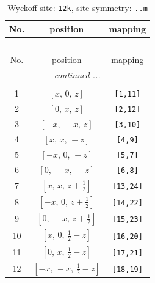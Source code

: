 \documentclass[fleqn,8pt]{jsarticle}
\begin{document}
\begin{longtable}{ccc}
\caption{Wyckoff site: {\tt 12k}, site symmetry: {\tt ..m}}
 \\
 \hline \hline
No. & position & mapping \\ \hline \endfirsthead

\multicolumn{2}{l}{\tablename\ \thetable{}} \\
 \hline \hline
No. & position & mapping \\ \hline \endhead

 \hline \hline
\multicolumn{2}{r}{\footnotesize\it continued ...} \\ \endfoot

 \hline \hline
\multicolumn{2}{r}{} \\ \endlastfoot

1 & $\left[ x,\, 0,\, z \right]$ & {\tt [1,11]} \\ \hline
2 & $\left[ 0,\, x,\, z \right]$ & {\tt [2,12]} \\ \hline
3 & $\left[ - x,\, - x,\, z \right]$ & {\tt [3,10]} \\ \hline
4 & $\left[ x,\, x,\, - z \right]$ & {\tt [4,9]} \\ \hline
5 & $\left[ - x,\, 0,\, - z \right]$ & {\tt [5,7]} \\ \hline
6 & $\left[ 0,\, - x,\, - z \right]$ & {\tt [6,8]} \\ \hline
7 & $\left[ x,\, x,\, z + \frac{1}{2} \right]$ & {\tt [13,24]} \\ \hline
8 & $\left[ - x,\, 0,\, z + \frac{1}{2} \right]$ & {\tt [14,22]} \\ \hline
9 & $\left[ 0,\, - x,\, z + \frac{1}{2} \right]$ & {\tt [15,23]} \\ \hline
10 & $\left[ x,\, 0,\, \frac{1}{2} - z \right]$ & {\tt [16,20]} \\ \hline
11 & $\left[ 0,\, x,\, \frac{1}{2} - z \right]$ & {\tt [17,21]} \\ \hline
12 & $\left[ - x,\, - x,\, \frac{1}{2} - z \right]$ & {\tt [18,19]} \\
\end{longtable}
\renewcommand{\arraystretch}{1.2}
\end{document}
